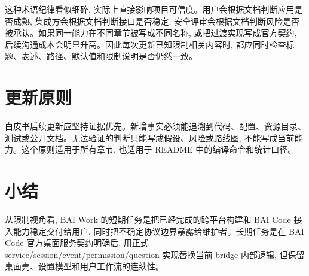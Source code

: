 这种术语纪律看似细碎, 实际上直接影响项目可信度。用户会根据文档判断应用是否成熟, 集成方会根据文档判断接口是否稳定, 安全评审会根据文档判断风险是否被承认。如果同一能力在不同章节被写成不同名称, 或把过渡实现写成官方契约, 后续沟通成本会明显升高。因此每次更新已知限制相关内容时, 都应同时检查标题、表述、路径、默认值和限制说明是否仍然一致。

\section{更新原则}
白皮书后续更新应坚持证据优先。新增事实必须能追溯到代码、配置、资源目录、测试或公开文档。无法验证的判断只能写成假设、风险或路线图, 不能写成当前能力。这个原则适用于所有章节, 也适用于 README 中的编译命令和统计口径。

\section{小结}
从限制视角看, BAI Work 的短期任务是把已经完成的跨平台构建和 BAI Code 接入能力稳定交付给用户, 同时把不确定协议边界暴露给维护者。长期任务是在 BAI Code 官方桌面服务契约明确后, 用正式 service/session/event/permission/question 实现替换当前 bridge 内部逻辑, 但保留桌面壳、设置模型和用户工作流的连续性。
